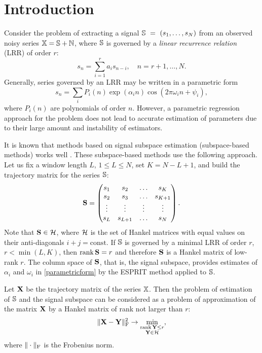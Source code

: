\documentclass[sii]{ipart}
\def\rank{\mathop{\mathrm{rank}}}
\begin{document}
\section{Introduction}
Consider the problem of extracting a signal $\mathbb{S}~=~(s_1, \ldots, s_N)$ from an observed noisy series $\mathbb{X} = \mathbb{S} + \mathbb{N}$, where $\mathbb{S}$ is governed by a \emph{linear recurrence relation} (LRR) of order $r$:
\begin{equation*}
s_n = \sum_{i = 1}^{r} a_i s_{n-i}, \quad n = r + 1, \ldots, N.
\end{equation*}
Generally, series governed by an LRR may be written in a parametric form
\begin{equation} \label{parametricform}
s_n = \sum_i P_i(n) \exp(\alpha_i n) \cos(2 \pi \omega_i n + \psi_i),
\end{equation}
where $P_i(n)$ are polynomials of order $n$. However, a parametric regression approach for the problem does not lead to accurate estimation of parameters due to their large amount and instability of estimators.

It is known that methods based on signal subspace estimation (subspace-based methods) works well \cite{Broomhead.King1986, Vautard.etal1992, Elsner.Tsonis1996, Golyandina.etal2001}. These subspace-based methods use the following approach. Let us fix a window length $L$, $1 \le L \le N$, set $K = N - L + 1$, and build the trajectory matrix for the series $\mathbb{S}$:
\begin{equation*}
\bfS = \begin{pmatrix}
s_1 & s_2 & \ldots & s_K \\
s_2 & s_3 & \ldots & s_{K + 1} \\
\vdots & \vdots & \vdots & \vdots \\
s_L & s_{L + 1} & \ldots & s_N
\end{pmatrix}.
\end{equation*}
Note that $\mathbf{S}\in \mathcal{H}$, where $\mathcal{H}$ is the set of Hankel matrices with equal values on their anti-diagonals $i+j=\mathrm{const}$.
If $\mathbb{S}$ is governed by a minimal LRR of order $r$, $r < \min(L, K)$, then $\rank \bfS = r$ and therefore $\mathbf{S}$ is a Hankel matrix of low-rank $r$. The column space of $\mathbf{S}$, that is, the  signal subspace, provides estimates of $\alpha_i$ and $\omega_i$ in \eqref{parametricform} by the ESPRIT method \cite{Roy.Kailath1989, Golyandina.Zhigljavsky2012} applied to $\mathbb{S}$.

Let $\mathbf{X}$ be the trajectory matrix of the series $\mathbb{X}$. Then the problem of estimation of $\mathbb{S}$ and the signal subspace can be considered as a problem of approximation of the matrix $\mathbf{X}$ by a Hankel matrix of rank not larger than $r$:
\begin{equation}\label{introd_task}
\|\bfX - \bfY\|^2_\rmF \to \min_{\substack{\rank \bfY \le r \\ \bfY \in \calH}},
\end{equation}
where $\|\cdot\|_{\mathrm{F}}$ is the Frobenius norm.
\end{document}

